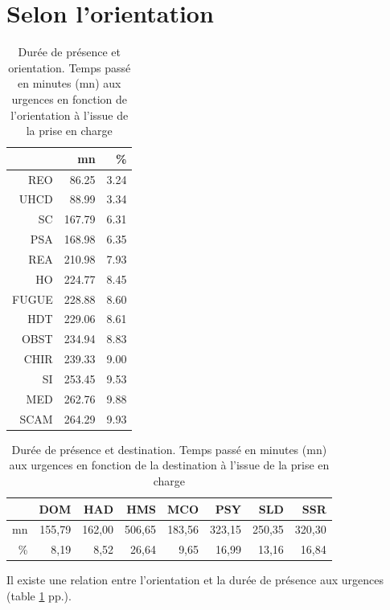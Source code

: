 \documentclass[12pt,english,french,twoside]{book}\usepackage[]{graphicx}\usepackage[]{color}
\begin{document}
\section{Selon l'orientation}
\begin{table}[ht]
\centering
\begin{tabular}{rrr}
  \hline
 & mn & \% \\ 
  \hline
REO & 86.25 & 3.24 \\ 
  UHCD & 88.99 & 3.34 \\ 
  SC & 167.79 & 6.31 \\ 
  PSA & 168.98 & 6.35 \\ 
  REA & 210.98 & 7.93 \\ 
  HO & 224.77 & 8.45 \\ 
  FUGUE & 228.88 & 8.60 \\ 
  HDT & 229.06 & 8.61 \\ 
  OBST & 234.94 & 8.83 \\ 
  CHIR & 239.33 & 9.00 \\ 
  SI & 253.45 & 9.53 \\ 
  MED & 262.76 & 9.88 \\ 
  SCAM & 264.29 & 9.93 \\ 
   \hline
\end{tabular}
\caption[Durée de présence et orientation]{Durée de présence et orientation. Temps passé en minutes (mn) aux urgences en fonction de l'orientation à l'issue de la prise en charge} 
\label{tab:duree_orientation}
\end{table}
\begin{table}[ht]
\centering
\begin{tabular}{rrrrrrrr}
  \hline
 & DOM & HAD & HMS & MCO & PSY & SLD & SSR \\ 
  \hline
mn & 155,79 & 162,00 & 506,65 & 183,56 & 323,15 & 250,35 & 320,30 \\ 
  \% & 8,19 & 8,52 & 26,64 & 9,65 & 16,99 & 13,16 & 16,84 \\ 
   \hline
\end{tabular}
\caption[Durée de présence et destination]{Durée de présence et destination. Temps passé en minutes (mn) aux urgences en fonction de la destination à l'issue de la prise en charge} 
\label{tab:duree_destination}
\end{table}


Il existe une relation entre l'orientation et la durée de présence aux urgences (table \ref{tab:duree_orientation} pp.\pageref{tab:duree_orientation}).
\end{document}
